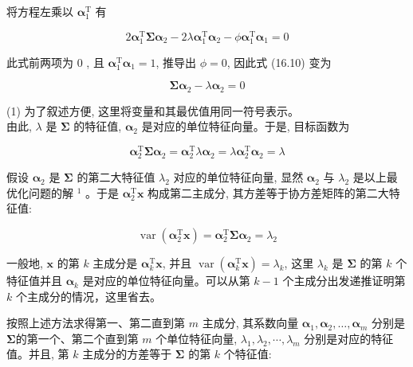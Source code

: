 \documentclass[10pt]{article}
\begin{document}
将方程左乘以 $\boldsymbol{\alpha}_{1}^{\mathrm{T}}$ 有

$$
2 \boldsymbol{\alpha}_{1}^{\mathrm{T}} \boldsymbol{\Sigma} \boldsymbol{\alpha}_{2}-2 \lambda \boldsymbol{\alpha}_{1}^{\mathrm{T}} \boldsymbol{\alpha}_{2}-\phi \boldsymbol{\alpha}_{1}^{\mathrm{T}} \boldsymbol{\alpha}_{1}=0
$$

此式前两项为 0 , 且 $\boldsymbol{\alpha}_{1}^{\mathrm{T}} \boldsymbol{\alpha}_{1}=1$, 推导出 $\phi=0$, 因此式 (16.10) 变为

$$
\boldsymbol{\Sigma} \boldsymbol{\alpha}_{2}-\lambda \boldsymbol{\alpha}_{2}=0
$$

(1) 为了叙述方便, 这里将变量和其最优值用同一符号表示。\\
由此, $\lambda$ 是 $\boldsymbol{\Sigma}$ 的特征值, $\boldsymbol{\alpha}_{2}$ 是对应的单位特征向量。于是, 目标函数为

$$
\boldsymbol{\alpha}_{2}^{\mathrm{T}} \boldsymbol{\Sigma} \boldsymbol{\alpha}_{2}=\boldsymbol{\alpha}_{2}^{\mathrm{T}} \lambda \boldsymbol{\alpha}_{2}=\lambda \boldsymbol{\alpha}_{2}^{\mathrm{T}} \boldsymbol{\alpha}_{2}=\lambda
$$

假设 $\boldsymbol{\alpha}_{2}$ 是 $\boldsymbol{\Sigma}$ 的第二大特征值 $\lambda_{2}$ 对应的单位特征向量, 显然 $\boldsymbol{\alpha}_{2}$ 与 $\lambda_{2}$ 是以上最优化问题的解 ${ }^{1}$ 。于是 $\boldsymbol{\alpha}_{2}^{\mathrm{T}} \boldsymbol{x}$ 构成第二主成分, 其方差等于协方差矩阵的第二大特征值:


\begin{equation*}
\operatorname{var}\left(\boldsymbol{\alpha}_{2}^{\mathrm{T}} \boldsymbol{x}\right)=\boldsymbol{\alpha}_{2}^{\mathrm{T}} \boldsymbol{\Sigma} \boldsymbol{\alpha}_{2}=\lambda_{2} \tag{16.11}
\end{equation*}


一般地, $\boldsymbol{x}$ 的第 $k$ 主成分是 $\boldsymbol{\alpha}_{k}^{\mathrm{T}} \boldsymbol{x}$, 并且 $\operatorname{var}\left(\boldsymbol{\alpha}_{k}^{\mathrm{T}} \boldsymbol{x}\right)=\lambda_{k}$, 这里 $\lambda_{k}$ 是 $\boldsymbol{\Sigma}$ 的第 $k$ 个特征值并且 $\boldsymbol{\alpha}_{k}$ 是对应的单位特征向量。可以从第 $k-1$ 个主成分出发递推证明第 $k$ 个主成分的情况，这里省去。

按照上述方法求得第一、第二直到第 $m$ 主成分, 其系数向量 $\boldsymbol{\alpha}_{1}, \boldsymbol{\alpha}_{2}, \ldots, \boldsymbol{\alpha}_{m}$ 分别是 $\boldsymbol{\Sigma}$的第一个、第二个直到第 $m$ 个单位特征向量, $\lambda_{1}, \lambda_{2}, \cdots, \lambda_{m}$ 分别是对应的特征值。并且, 第 $k$ 主成分的方差等于 $\boldsymbol{\Sigma}$ 的第 $k$ 个特征值:
\end{document}
